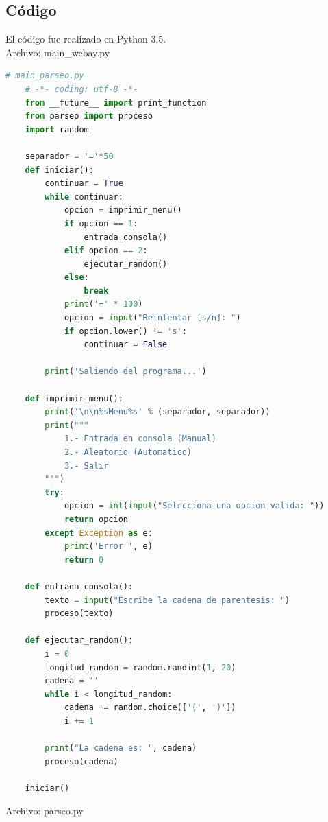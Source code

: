 	\subsection{Código}
	El código fue realizado en Python 3.5.
	\\Archivo: main\_webay.py
	\begin{lstlisting}[language=Python]
	# main_parseo.py
	# -*- coding: utf-8 -*-
	from __future__ import print_function
	from parseo import proceso
	import random

	separador = '='*50
	def iniciar():
	    continuar = True
	    while continuar:
	        opcion = imprimir_menu()
	        if opcion == 1:
	            entrada_consola()
	        elif opcion == 2:
	            ejecutar_random()
	        else:
	            break
	        print('=' * 100)
	        opcion = input("Reintentar [s/n]: ")
	        if opcion.lower() != 's':
	            continuar = False

	    print('Saliendo del programa...')

	def imprimir_menu():
	    print('\n\n%sMenu%s' % (separador, separador))
	    print("""
	        1.- Entrada en consola (Manual)
	        2.- Aleatorio (Automatico)
	        3.- Salir
	    """)
	    try:
	        opcion = int(input("Selecciona una opcion valida: "))
	        return opcion
	    except Exception as e:
	        print('Error ', e)
	        return 0

	def entrada_consola():
	    texto = input("Escribe la cadena de parentesis: ")
	    proceso(texto)

	def ejecutar_random():
	    i = 0
	    longitud_random = random.randint(1, 20)
	    cadena = ''
	    while i < longitud_random:
	        cadena += random.choice(['(', ')'])
	        i += 1

	    print("La cadena es: ", cadena)
	    proceso(cadena)

	iniciar()
	\end{lstlisting}
	Archivo: parseo.py
